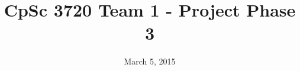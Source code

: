 \documentclass[11pt,openany]{report}
\begin{document}
\title{{\Huge CpSc 3720 Team 1 - Project Phase 3}}
\author{}
\date{March 5, 2015}
\maketitle




\end{document}
